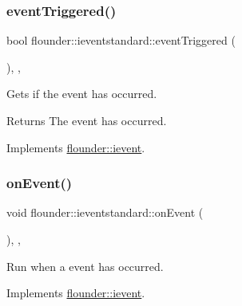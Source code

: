 \subsubsection{\texorpdfstring{event\+Triggered()}{eventTriggered()}}
{\footnotesize\ttfamily bool flounder\+::ieventstandard\+::event\+Triggered (\begin{DoxyParamCaption}{ }\end{DoxyParamCaption})\hspace{0.3cm}{\ttfamily [inline]}, {\ttfamily [override]}, {\ttfamily [virtual]}}



Gets if the event has occurred. 

\begin{DoxyReturn}{Returns}
The event has occurred. 
\end{DoxyReturn}


Implements \hyperlink{classflounder_1_1ievent_a4462f66feef99ef4e3521c00f4edd0c9}{flounder\+::ievent}.

\mbox{\label{classflounder_1_1ieventstandard_ac559905d5c7f4067ecc474742a1e24b8}} 
\subsubsection{\texorpdfstring{on\+Event()}{onEvent()}}
{\footnotesize\ttfamily void flounder\+::ieventstandard\+::on\+Event (\begin{DoxyParamCaption}{ }\end{DoxyParamCaption})\hspace{0.3cm}{\ttfamily [inline]}, {\ttfamily [override]}, {\ttfamily [virtual]}}



Run when a event has occurred. 



Implements \hyperlink{classflounder_1_1ievent_a6c6abe67435870b25eccd57a251a8992}{flounder\+::ievent}.

\mbox{\label{classflounder_1_1ieventstandard_ac54c83ea92a634d2f389e712afda83fc}} 
